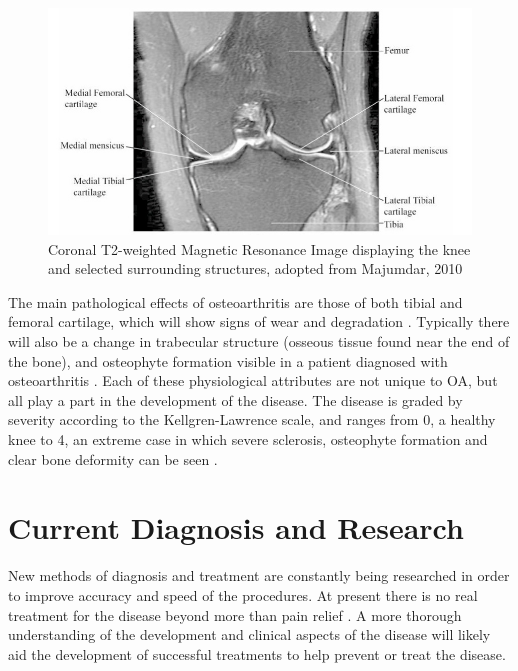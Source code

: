 \documentclass[11pt,a4paper]{memoir}
\numberwithin{figure}{section}
\numberwithin{table}{section}
\numberwithin{equation}{section}
\begin{document}
\begin{figure}[h]
\centering
\includegraphics[scale=0.4]{knee_anatomy.jpg}
\caption[Knee anatomy shown in a saggital slice of a knee MRI scan ]{Coronal T2-weighted Magnetic Resonance Image displaying the knee and selected surrounding structures, adopted from Majumdar, 2010 \cite{Majumdar2010AdvancesOsteoarthritis}}
\label{fig:Knee}
\end{figure}

The main pathological effects of osteoarthritis are those of both tibial and femoral cartilage, which will show signs of wear and degradation \cite{Cicuttini2001}. Typically there will also be a change in trabecular structure (osseous tissue found near the end of the bone), and osteophyte formation visible in a patient diagnosed with osteoarthritis \cite{Eckstein2009}. Each of these physiological attributes are not unique to OA, but all play a part in the development of the disease. The disease is graded by severity according to the Kellgren-Lawrence scale, and ranges from 0, a healthy knee to 4, an extreme case in which severe sclerosis, osteophyte formation and clear bone deformity can be seen \cite{Schiphof2008DifferencesOsteoarthritis.}.

\section{Current Diagnosis and Research}
New methods of diagnosis and treatment are constantly being researched in order to improve accuracy and speed of the procedures. At present there is no real treatment for the disease beyond more than pain relief \cite{Dieppe2011}. A more thorough understanding of the development and clinical aspects of the disease will likely aid the development of successful treatments to help prevent or treat the disease.  \\ 
\end{document}
